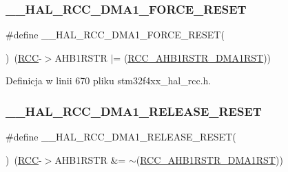 \subsubsection{\texorpdfstring{\+\_\+\+\_\+\+H\+A\+L\+\_\+\+R\+C\+C\+\_\+\+D\+M\+A1\+\_\+\+F\+O\+R\+C\+E\+\_\+\+R\+E\+S\+ET}{\_\_HAL\_RCC\_DMA1\_FORCE\_RESET}}
{\footnotesize\ttfamily \#define \+\_\+\+\_\+\+H\+A\+L\+\_\+\+R\+C\+C\+\_\+\+D\+M\+A1\+\_\+\+F\+O\+R\+C\+E\+\_\+\+R\+E\+S\+ET(\begin{DoxyParamCaption}{ }\end{DoxyParamCaption})~(\hyperlink{group___peripheral__declaration_ga74944438a086975793d26ae48d5882d4}{R\+CC}-\/$>$A\+H\+B1\+R\+S\+TR $\vert$= (\hyperlink{group___peripheral___registers___bits___definition_ga4d1655ddfb777fce28b1d6b9a9c2d0e0}{R\+C\+C\+\_\+\+A\+H\+B1\+R\+S\+T\+R\+\_\+\+D\+M\+A1\+R\+ST}))}



Definicja w linii 670 pliku stm32f4xx\+\_\+hal\+\_\+rcc.\+h.

\mbox{\label{group___r_c_c___a_h_b1___force___release___reset_ga8f7eef8316c35175df11d77f5106d334}} 
\subsubsection{\texorpdfstring{\+\_\+\+\_\+\+H\+A\+L\+\_\+\+R\+C\+C\+\_\+\+D\+M\+A1\+\_\+\+R\+E\+L\+E\+A\+S\+E\+\_\+\+R\+E\+S\+ET}{\_\_HAL\_RCC\_DMA1\_RELEASE\_RESET}}
{\footnotesize\ttfamily \#define \+\_\+\+\_\+\+H\+A\+L\+\_\+\+R\+C\+C\+\_\+\+D\+M\+A1\+\_\+\+R\+E\+L\+E\+A\+S\+E\+\_\+\+R\+E\+S\+ET(\begin{DoxyParamCaption}{ }\end{DoxyParamCaption})~(\hyperlink{group___peripheral__declaration_ga74944438a086975793d26ae48d5882d4}{R\+CC}-\/$>$A\+H\+B1\+R\+S\+TR \&= $\sim$(\hyperlink{group___peripheral___registers___bits___definition_ga4d1655ddfb777fce28b1d6b9a9c2d0e0}{R\+C\+C\+\_\+\+A\+H\+B1\+R\+S\+T\+R\+\_\+\+D\+M\+A1\+R\+ST}))}



